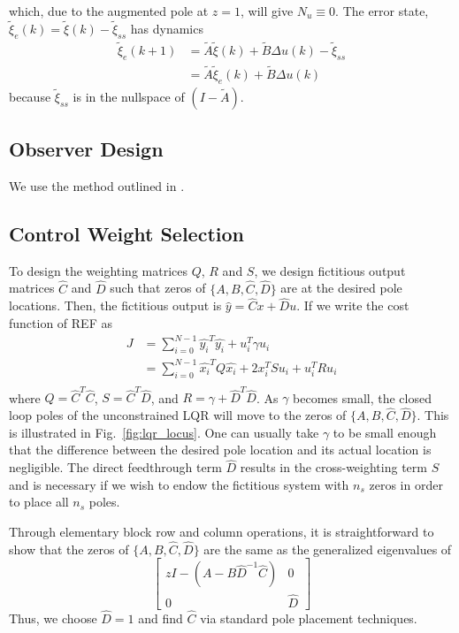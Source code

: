 \documentclass[journal,twocolumn,twoside]{IEEEtran/IEEEtran}
\newcommand{\Ad}{\ensuremath{\tilde A }\xspace}
\newcommand{\Bd}{\ensuremath{\tilde B }\xspace}
\newcommand{\xd}{\ensuremath{\tilde \xi }\xspace}
\newcommand{\xdss}{\ensuremath{\tilde \xi_{ss} }\xspace}
\newcommand{\xde}{\ensuremath{\tilde \xi_{e} }\xspace}
\newcommand{\dd}{\ensuremath{\Delta }\xspace}
\begin{document}
which, due to the augmented pole at $z=1$, will give \(N_u\equiv 0\). 
The error state, \({\xde(k)=\xd(k) - \xdss}\) has dynamics
\begin{align}
  \xde(k+1) & = \Ad\xd(k) + \Bd\dd u(k) - \xdss \nonumber\\
            & = \Ad \xde(k)   + \Bd \dd u(k)\nonumber
\end{align}
because $\xdss$ is in the nullspace of $(I - \Ad)$.

\subsection{Observer Design}

We use the method outlined in \cite{doyle_robustness_1979}.

\subsection{Control Weight Selection}
To design the weighting matrices $Q$, $R$ and $S$, we design fictitious output matrices $\hat C$ and $\hat D$ such that zeros of $\{A, B, \hat C, \hat D\}$ are at the desired pole locations. Then, the fictitious output is $\hat y = \hat C x + \hat D u$. If we write the cost function of REF as
\begin{align}
  J &= \sum_{i=0}^{N-1} \hat{y_i}^T\hat{y_i} + u_i^T\gamma u_i\\
    &= \sum_{i=0}^{N-1} \hat{x_i}^TQ\hat{x_i} + 2x_i^TSu_i + u_i^TRu_i\\
\end{align}
where $Q = \hat{C}^T\hat{C}$, $S =\hat{C}^T \hat{D}$, and $R = \gamma + \hat{D}^T\hat{D}$. As $\gamma$ becomes small, the closed loop poles of the unconstrained LQR will move to the zeros of $\{A, B, \hat C, \hat D\}$. This is illustrated in Fig.~\ref{fig:lqr_locus}. One can usually take $\gamma$ to be small enough that the difference between the desired pole location and its actual location is negligible. The direct feedthrough term $\hat D$ results in the cross-weighting term $S$ and is necessary if we wish to endow the fictitious system with $n_s$ zeros in order to place all $n_s$ poles.

Through elementary block row and column operations, it is straightforward to show that the zeros of
$\{A, B, \hat C, \hat D\}$ are the same as the generalized eigenvalues of
\begin{equation}
  \begin{bmatrix}
    zI -(A - B\hat{D}^{-1}\hat{C}) & 0\\
    0 & \hat{D}
  \end{bmatrix}
\end{equation}
Thus, we choose $\hat D = 1$ and find $\hat C$ via standard pole placement techniques.
\end{document}
